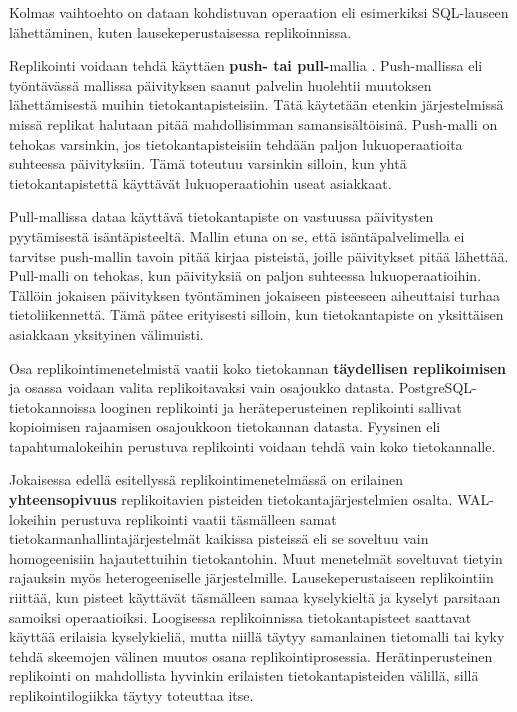 \documentclass[finnish,twoside,censored,csm,sw-track-2018]{HYthesisML}
\begin{document}
Kolmas vaihtoehto on dataan kohdistuvan operaation eli esimerkiksi SQL-lauseen lähettäminen, kuten lausekeperustaisessa replikoinnissa.

Replikointi voidaan tehdä käyttäen \textbf{push- tai pull-}mallia \citep{Tanenbaum}. Push-mallissa eli työntävässä mallissa päivityksen saanut palvelin huolehtii muutoksen lähettämisestä muihin tietokantapisteisiin. Tätä käytetään etenkin järjestelmissä missä replikat halutaan pitää mahdollisimman samansisältöisinä. Push-malli on tehokas varsinkin, jos tietokantapisteisiin tehdään paljon lukuoperaatioita suhteessa päivityksiin. Tämä toteutuu varsinkin silloin, kun yhtä tietokantapistettä käyttävät lukuoperaatiohin useat asiakkaat.

Pull-mallissa dataa käyttävä tietokantapiste on vastuussa päivitysten pyytämisestä isäntäpisteeltä. Mallin etuna on se, että isäntäpalvelimella ei tarvitse push-mallin tavoin pitää kirjaa pisteistä, joille päivitykset pitää lähettää. Pull-malli on tehokas, kun päivityksiä on paljon suhteessa lukuoperaatioihin. Tällöin jokaisen päivityksen työntäminen jokaiseen pisteeseen aiheuttaisi turhaa tietoliikennettä. Tämä pätee erityisesti silloin, kun tietokantapiste on yksittäisen asiakkaan yksityinen välimuisti.

Osa replikointimenetelmistä vaatii koko tietokannan \textbf{täydellisen replikoimisen} ja osassa voidaan valita replikoitavaksi vain osajoukko datasta. PostgreSQL-tietokannoissa looginen replikointi ja heräteperusteinen replikointi sallivat kopioimisen rajaamisen osajoukkoon tietokannan datasta. Fyysinen eli tapahtumalokeihin perustuva replikointi voidaan tehdä vain koko tietokannalle.

Jokaisessa edellä esitellyssä replikointimenetelmässä on erilainen \textbf{yhteensopivuus} replikoitavien pisteiden tietokantajärjestelmien osalta. WAL-lokeihin perustuva replikointi vaatii täsmälleen samat tietokannanhallintajärjestelmät kaikissa pisteissä eli se soveltuu vain homogeenisiin hajautettuihin tietokantohin. Muut menetelmät soveltuvat tietyin rajauksin myös heterogeeniselle järjestelmille. Lausekeperustaiseen replikointiin riittää, kun pisteet käyttävät täsmälleen samaa kyselykieltä ja kyselyt parsitaan samoiksi operaatioiksi. Loogisessa replikoinnissa tietokantapisteet saattavat käyttää erilaisia kyselykieliä, mutta niillä täytyy samanlainen tietomalli tai kyky tehdä skeemojen välinen muutos osana replikointiprosessia. Herätinperusteinen replikointi on mahdollista hyvinkin erilaisten tietokantapisteiden välillä, sillä replikointilogiikka täytyy toteuttaa itse.
\end{document}
